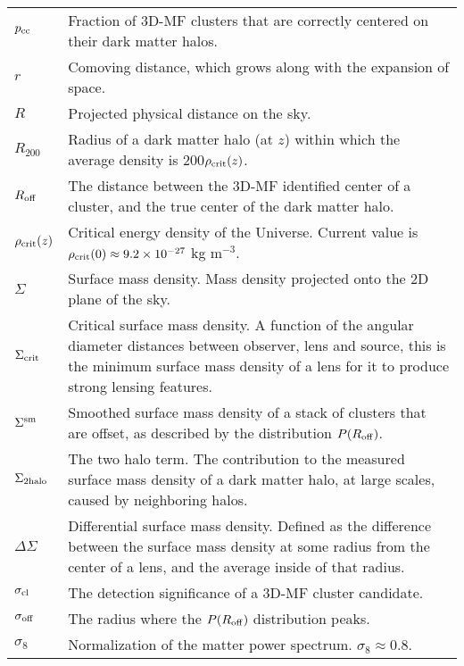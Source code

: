\section*{\underline{}}
\vspace{-0.5cm}
\begin{tabular}{p{0.6in}p{5.8in}}


$p_{\rm cc}$ & Fraction of \acs{3D-MF} clusters that are correctly centered on their dark matter halos. \\
$r$ & Comoving distance, which grows along with the expansion of space. \\
$R$ & Projected physical distance on the sky. \\
$R_{200}$ & Radius of a dark matter halo (at $z$) within which the average density is 200$\rho_{\rm crit}(z)$. \\
$R_{\rm off}$ & The distance between the \acs{3D-MF} identified center of a cluster, and the true center of the dark matter halo. \\
$\rho_{\rm crit}(z)$ & Critical energy density of the Universe. Current value is $\rho_{\rm crit}(0) \approx 9.2 \times 10^{-27}$ kg m$^{-3}$. \\
$\Sigma$ & Surface mass density. Mass density projected onto the 2D plane of the sky. \\
$\Sigma_{\rm crit}$ & Critical surface mass density. A function of the angular diameter distances between observer, lens and source, this is the minimum surface mass density of a lens for it to produce strong lensing features. \\
$\Sigma^{\rm sm}$ & Smoothed surface mass density of a stack of clusters that are offset, as described by the distribution $P(R_{\rm off})$. \\
$\Sigma_{\rm 2halo}$ & The two halo term. The contribution to the measured surface mass density of a dark matter halo, at large scales, caused by neighboring halos. \\
$\Delta\Sigma$ & Differential surface mass density. Defined as the difference between the surface mass density at some radius from the center of a lens, and the average inside of that radius. \\
$\sigma_{\rm cl}$ & The detection significance of a \acs{3D-MF} cluster candidate. \\
$\sigma_{\rm off}$ & The radius where the $P(R_{\rm off})$ distribution peaks. \\
$\sigma_8$ & Normalization of the matter power spectrum.  $\sigma_8 \approx 0.8$. \\

\end{tabular}

